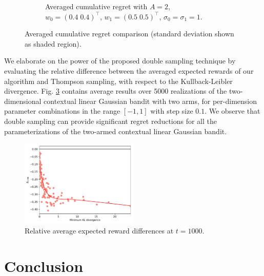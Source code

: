 \documentclass{article}
\begin{document}
\begin{figure}[!h]
\begin{subfigure}[b]{0.5\textwidth}
		\caption{Averaged cumulative regret with $A=2$, \\ $w_0=(0.4 \; 0.4)^\top$, $w_1=(0.5 \; 0.5)^\top$, $\sigma_0=\sigma_1=1$.}
		\label{fig:linearGaussian_cumulative_regret_notgreat}
	\end{subfigure}
	\caption{Averaged cumulative regret comparison (standard deviation shown as shaded region).}
	\label{fig:linearGaussian_cumulative_regret_compare}
\end{figure}

We elaborate on the power of the proposed double sampling technique by evaluating the relative difference between the averaged expected rewards of our algorithm and Thompson sampling, with respect to the Kullback-Leibler divergence. 
Fig. \ref{fig:linearGaussian_relative_cumregret_kl} contains average results over 5000 realizations of the two-dimensional contextual linear Gaussian bandit with two arms, for per-dimension parameter combinations in the range $[-1,1]$ with step size $0.1$. We observe that double sampling can provide significant regret reductions for all the parameterizations of the two-armed contextual linear Gaussian bandit.

\begin{figure}[!h]
	\centering
	\includegraphics[width=0.5\textwidth]{./figs/linearGaussian/min_KL_relDiff_t1000_07.pdf}
	\caption{Relative average expected reward differences at $t=1000$.}
	\label{fig:linearGaussian_relative_cumregret_kl}
\end{figure}

%

\section{Conclusion}
\label{sec:conclusion}
\end{document}
